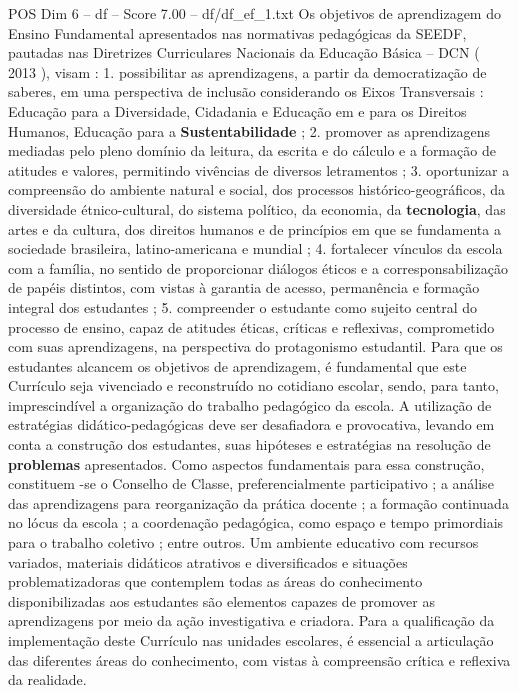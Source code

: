 \begin{textsample}{POS Dim 6 – df – Score 7.00 – df/df\_ef\_1.txt}
Os objetivos de aprendizagem do Ensino Fundamental apresentados nas normativas pedagógicas da SEEDF, pautadas nas Diretrizes Curriculares Nacionais da Educação Básica – DCN ( 2013 ), visam : 1. possibilitar as aprendizagens, a partir da democratização de saberes, em uma perspectiva de inclusão considerando os Eixos Transversais : Educação para a Diversidade, Cidadania e Educação em e para os Direitos Humanos, Educação para a \textbf{Sustentabilidade} ; 2. promover as aprendizagens mediadas pelo pleno domínio da leitura, da escrita e do cálculo e a formação de atitudes e valores, permitindo vivências de diversos letramentos ; 3. oportunizar a compreensão do ambiente natural e social, dos processos histórico-geográficos, da diversidade étnico-cultural, do sistema político, da economia, da \textbf{tecnologia}, das artes e da cultura, dos direitos humanos e de princípios em que se fundamenta a sociedade brasileira, latino-americana e mundial ; 4. fortalecer vínculos da escola com a família, no sentido de proporcionar diálogos éticos e a corresponsabilização de papéis distintos, com vistas à garantia de acesso, permanência e formação integral dos estudantes ; 5. compreender o estudante como sujeito central do processo de ensino, capaz de atitudes éticas, críticas e reflexivas, comprometido com suas aprendizagens, na perspectiva do protagonismo estudantil.
Para que os estudantes alcancem os objetivos de aprendizagem, é fundamental que este Currículo seja vivenciado e reconstruído no cotidiano escolar, sendo, para tanto, imprescindível a organização do trabalho pedagógico da escola.
A utilização de estratégias didático-pedagógicas deve ser desafiadora e provocativa, levando em conta a construção dos estudantes, suas hipóteses e estratégias na resolução de \textbf{problemas} apresentados.
Como aspectos fundamentais para essa construção, constituem -se o Conselho de Classe, preferencialmente participativo ; a análise das aprendizagens para reorganização da prática docente ; a formação continuada no lócus da escola ; a coordenação pedagógica, como espaço e tempo primordiais para o trabalho coletivo ; entre outros.
Um ambiente educativo com recursos variados, materiais didáticos atrativos e diversificados e situações problematizadoras que contemplem todas as áreas do conhecimento disponibilizadas aos estudantes são elementos capazes de promover as aprendizagens por meio da ação investigativa e criadora.
Para a qualificação da implementação deste Currículo nas unidades escolares, é essencial a articulação das diferentes áreas do conhecimento, com vistas à compreensão crítica e reflexiva da realidade.

\end{textsample}
